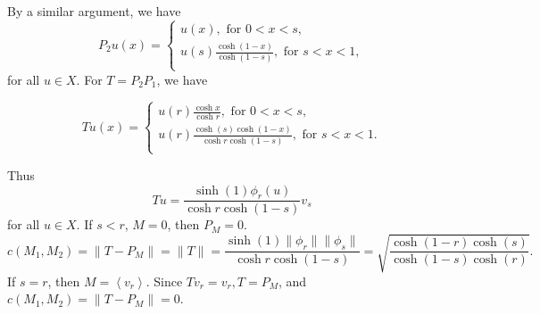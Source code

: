 By a similar argument, we have
$$P_2u(x)=\begin{cases}u(x), \mbox{ for } 0<x<s,\\
u(s)\frac{\cosh(1-x)}{\cosh(1-s)}, \mbox{ for } s<x<1,\\
\end{cases}$$
for all $u\in X$.  For $T=P_2P_1$, we have 

$$Tu(x)=\begin{cases} u(r)\frac{\cosh x}{\cosh r}, \mbox{ for } 0<x<s,\\
u(r)\frac{\cosh(s)\cosh(1-x)}{\cosh r\cosh (1-s)}, \mbox{ for } s<x<1.\\
\end{cases}$$

Thus 
$$Tu=\frac{\sinh(1)\phi_r(u)}{\cosh r\cosh(1-s)}v_s$$
for all $u\in X$.
If $s<r$, $M={0}$, then $P_{M}=0$. 
$$c(M_1,M_2)=\|T-P_M\|=\|T\|=\frac{\sinh(1)\|\phi_r\|\|\phi_s\|}{\cosh r\cosh(1-s)}=\sqrt{\frac{\cosh(1-r)\cosh(s)}{\cosh(1-s)\cosh(r)}}.$$
If $s=r$, then $M=\left\langle v_r\right\rangle$. Since $Tv_r=v_r, T=P_{M}$, and $c(M_1,M_2)=\|T-P_{M}\|=0$.